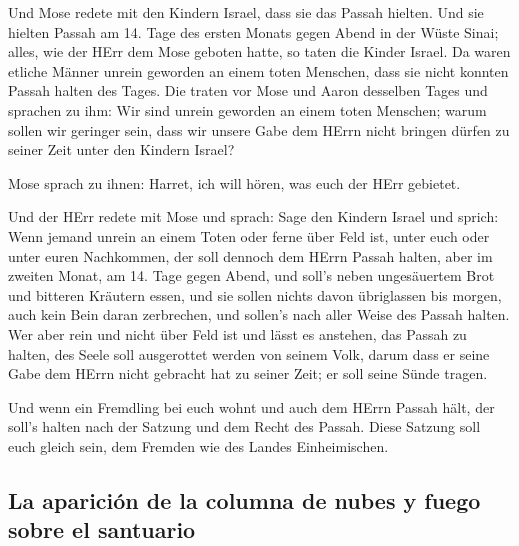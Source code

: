  Und Mose redete mit den Kindern Israel, dass sie das
Passah hielten.  Und sie hielten Passah am 14. Tage des
ersten Monats gegen Abend in der Wüste Sinai; alles, wie der HErr dem
Mose geboten hatte, so taten die Kinder Israel.  Da waren
etliche Männer unrein geworden an einem toten Menschen, dass sie nicht
konnten Passah halten des Tages. Die traten vor Mose und Aaron desselben
Tages  und sprachen zu ihm: Wir sind unrein geworden an
einem toten Menschen; warum sollen wir geringer sein, dass wir unsere
Gabe dem HErrn nicht bringen dürfen zu seiner Zeit unter den Kindern
Israel?

 Mose sprach zu ihnen: Harret, ich will hören, was euch
der HErr gebietet.

 Und der HErr redete mit Mose und sprach: 
Sage den Kindern Israel und sprich: Wenn jemand unrein an einem Toten
oder ferne über Feld ist, unter euch oder unter euren Nachkommen, der
soll dennoch dem HErrn Passah halten,  aber im zweiten
Monat, am 14. Tage gegen Abend, und soll's neben ungesäuertem Brot und
bitteren Kräutern essen,  und sie sollen nichts davon
übriglassen bis morgen, auch kein Bein daran zerbrechen, und sollen's
nach aller Weise des Passah halten.  Wer aber rein und
nicht über Feld ist und lässt es anstehen, das Passah zu halten, des
Seele soll ausgerottet werden von seinem Volk, darum dass er seine Gabe
dem HErrn nicht gebracht hat zu seiner Zeit; er soll seine Sünde tragen.

 Und wenn ein Fremdling bei euch wohnt und auch dem HErrn
Passah hält, der soll's halten nach der Satzung und dem Recht des
Passah. Diese Satzung soll euch gleich sein, dem Fremden wie des Landes
Einheimischen.

\hypertarget{la-apariciuxf3n-de-la-columna-de-nubes-y-fuego-sobre-el-santuario}{%
\subsection{La aparición de la columna de nubes y fuego sobre el
santuario}\label{la-apariciuxf3n-de-la-columna-de-nubes-y-fuego-sobre-el-santuario}}

